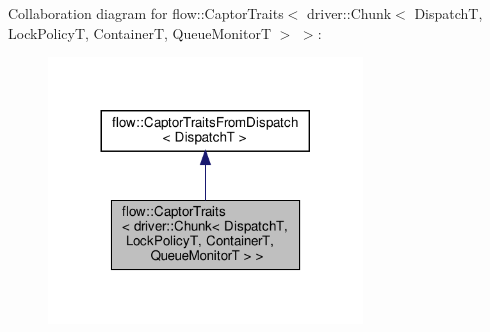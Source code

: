 Collaboration diagram for flow\+:\+:Captor\+Traits$<$ driver\+:\+:Chunk$<$ DispatchT, Lock\+PolicyT, ContainerT, Queue\+MonitorT $>$ $>$\+:
\nopagebreak
\begin{figure}[H]
\begin{center}
\leavevmode
\includegraphics[width=236pt]{structflow_1_1_captor_traits_3_01driver_1_1_chunk_3_01_dispatch_t_00_01_lock_policy_t_00_01_cont659f81f1f0b31165d4c94f5bd0a0144c}
\end{center}
\end{figure}
